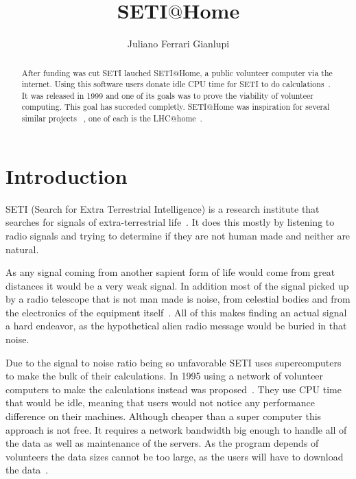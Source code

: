 
\title{SETI$@$Home}

\author{Juliano Ferrari Gianlupi}


\renewcommand{\shortauthors}{J. F. Gianlupi}


\begin{abstract}
After funding was cut SETI lauched SETI$@$Home, a public volunteer computer 
via the internet. Using this software users donate idle CPU time for SETI to do 
calculations~\cite{hid-sp18-601-www-sathome-about}. It was released in 1999 and 
one of its goals was to prove the viability of volunteer computing. This goal 
has succeded completly. SETI$@$Home was inspiration for several similar projects
 ~\cite{hid-sp18-601-www-boinc-projects}, one of each is the 
 LHC$@$home~\cite{hid-sp18-601-www-lhc-at-home-history}.
\end{abstract}



\maketitle

\section{Introduction}
\label{hid-sp18-601-section-introduction}
SETI (Search for Extra Terrestrial Intelligence) is a research institute that 
searches for signals of extra-terrestrial 
life~\cite{hid-sp18-601-paper-cocconi1959searching}. It does this mostly by 
listening to radio signals and trying to determine if they are not human made 
and neither are natural. 

As any signal coming from another sapient form of life would come from great 
distances it would be a very weak signal. In addition most of the signal picked 
up by a radio telescope that is not man made is noise, from celestial bodies 
and from the electronics of the equipment 
itself~\cite{hid-sp18-601-paper-anderson2002seti}. All of this makes finding an 
actual signal a hard endeavor, as the hypothetical alien radio message would be 
buried in that noise.

Due to the signal to noise ratio being so unfavorable SETI uses supercomputers 
to make the bulk of their calculations. In 1995 using a network of volunteer 
computers to make the calculations instead was 
proposed~\cite{hid-sp18-601-book-foster1999carl}. They use CPU time that would
be idle, meaning that users would not notice any performance difference on 
their machines. Although cheaper than a super computer this approach is 
not free. It requires a network bandwidth big enough
to handle all of the data as well as maintenance of the servers. As the 
program depends of volunteers the data sizes cannot be too large, as the users
will have to download the data~\cite{hid-sp18-601-paper-anderson2002seti}.


